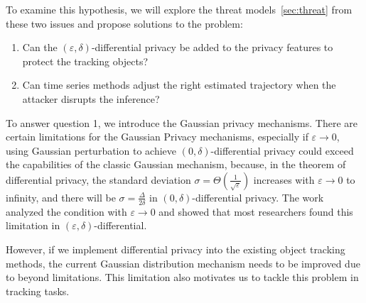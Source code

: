 \documentclass[trans]{IEEEtran}
\newcommand{\el}[1]{{\color{black}#1}}
\begin{document}
To \el{examine} this hypothesis, we will explore the threat models~\ref{sec:threat} from these two issues and propose solutions to the problem:

\begin{enumerate}
    \item Can the $(\varepsilon,\delta)$-differential privacy be added to the privacy features to protect the tracking objects?
    \item Can time series methods adjust the right estimated trajectory when the attacker disrupts the inference?  
\end{enumerate}

To answer question 1, we introduce the Gaussian privacy mechanisms. There are certain limitations for the Gaussian Privacy mechanisms, especially if $\varepsilon \rightarrow 0$, using Gaussian perturbation to achieve $(0,\delta)$-differential privacy could exceed the capabilities of the classic Gaussian mechanism, because, in the theorem of differential privacy, the standard deviation $\sigma=\Theta(\frac{1}{\sqrt{\varepsilon}})$ increases with $\varepsilon \rightarrow 0$ to infinity, and there will be $\sigma=\frac{\Delta}{2\delta}$  in $(0,\delta)$-differential privacy. The work~\cite{balle2018improving} analyzed the condition with $\varepsilon \rightarrow 0$ and showed that most researchers found this limitation in  $(\varepsilon,\delta)$-differential.

However, if we implement differential privacy into the existing object tracking methods, the current Gaussian distribution mechanism needs to be improved due to beyond limitations. This limitation also motivates us to tackle this problem in tracking tasks.
\end{document}
